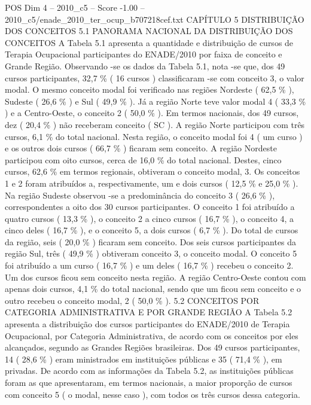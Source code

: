 \begin{textsample}{POS Dim 4 – 2010\_c5 – Score -1.00 – 2010\_c5/enade\_2010\_ter\_ocup\_b707218cef.txt}  \label{ex:f4_pos_232}
CAPÍTULO 5 DISTRIBUIÇÃO DOS CONCEITOS 5.1 PANORAMA NACIONAL DA DISTRIBUIÇÃO DOS CONCEITOS A Tabela 5.1 apresenta a quantidade e distribuição de cursos de Terapia Ocupacional participantes do ENADE/2010 por faixa de conceito e Grande Região.
Observando -se os dados da Tabela 5.1, nota -se que, dos 49 cursos participantes, 32,7 \% ( 16 cursos ) classificaram -se com conceito 3, o valor modal.
O mesmo conceito modal foi verificado nas regiões Nordeste ( 62,5 \% ), Sudeste ( 26,6 \% ) e Sul ( 49,9 \% ).
Já a região Norte teve valor modal 4 ( 33,3 \% ) e a Centro-Oeste, o conceito 2 ( 50,0 \% ).
Em termos nacionais, dos 49 cursos, dez ( 20,4 \% ) não receberam conceito ( SC ).
A região Norte participou com três cursos, 6,1 \% do total nacional.
Nesta região, o conceito modal foi 4 ( um curso ) e os outros dois cursos ( 66,7 \% ) ficaram sem conceito.
A região Nordeste participou com oito cursos, cerca de 16,0 \% do total nacional.
Destes, cinco cursos, 62,6 \% em termos regionais, obtiveram o conceito modal, 3.
Os conceitos 1 e 2 foram atribuídos a, respectivamente, um e dois cursos ( 12,5 \% e 25,0 \% ).
Na região Sudeste observou -se a predominância do conceito 3 ( 26,6 \% ), correspondentes a oito dos 30 cursos participantes.
O conceito 1 foi atribuído a quatro cursos ( 13,3 \% ), o conceito 2 a cinco cursos ( 16,7 \% ), o conceito 4, a cinco deles ( 16,7 \% ), e o conceito 5, a dois cursos ( 6,7 \% ).
Do total de cursos da região, seis ( 20,0 \% ) ficaram sem conceito.
Dos seis cursos participantes da região Sul, três ( 49,9 \% ) obtiveram conceito 3, o conceito modal.
O conceito 5 foi atribuído a um curso ( 16,7 \% ) e um deles ( 16,7 \% ) recebeu o conceito 2.
Um dos cursos ficou sem conceito nesta região.
A região Centro-Oeste contou com apenas dois cursos, 4,1 \% do total nacional, sendo que um ficou sem conceito e o outro recebeu o conceito modal, 2 ( 50,0 \% ). 5.2 CONCEITOS POR CATEGORIA ADMINISTRATIVA E POR GRANDE REGIÃO A Tabela 5.2 apresenta a distribuição dos cursos participantes do ENADE/2010 de Terapia Ocupacional, por Categoria Administrativa, de acordo com os conceitos por eles alcançados, segundo as Grandes Regiões brasileiras.
Dos 49 cursos participantes, 14 ( 28,6 \% ) eram ministrados em instituições públicas e 35 ( 71,4 \% ), em privadas.
De acordo com as informações da Tabela 5.2, as instituições públicas foram as que apresentaram, em termos nacionais, a maior proporção de cursos com conceito 5 ( o modal, nesse caso ), com todos os três cursos dessa categoria.

\end{textsample}
